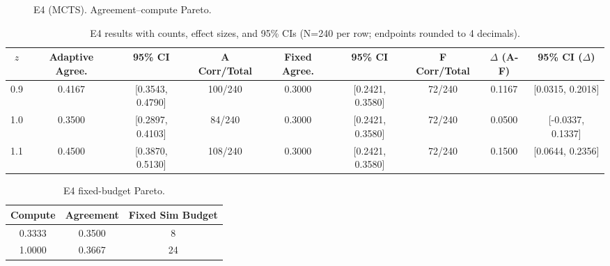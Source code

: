 \begin{figure}[H]
  \centering
  \begin{adjustbox}{width=\linewidth}
  \end{adjustbox}
  \caption{E4 (MCTS). Agreement--compute Pareto.}
  \label{fig:e4b}
\end{figure}

\begin{table}[H]
  \centering
  \caption{E4 results with counts, effect sizes, and 95\% CIs (N=240 per row; endpoints rounded to 4 decimals).}
  \vspace{0.25em}
  \begin{adjustbox}{width=\linewidth}
  \begin{tabular}{c c c c c c c c c}
    \toprule
    $z$ & Adaptive Agree. & 95\% CI & A Corr/Total & Fixed Agree. & 95\% CI & F Corr/Total & $\Delta$ (A-F) & 95\% CI ($\Delta$) \\
    \midrule
    0.9 & 0.4167 & [0.3543, 0.4790] & 100/240 & 0.3000 & [0.2421, 0.3580] & 72/240 & 0.1167 & [0.0315, 0.2018] \\
    1.0 & 0.3500 & [0.2897, 0.4103] & 84/240  & 0.3000 & [0.2421, 0.3580] & 72/240 & 0.0500 & [-0.0337, 0.1337] \\
    1.1 & 0.4500 & [0.3870, 0.5130] & 108/240 & 0.3000 & [0.2421, 0.3580] & 72/240 & 0.1500 & [0.0644, 0.2356] \\
    \bottomrule
  \end{tabular}
  \end{adjustbox}
\end{table}

\begin{table}[H]
  \centering
  \caption{E4 fixed-budget Pareto.}
  \vspace{0.25em}
  \begin{adjustbox}{width=\linewidth}
  \begin{tabular}{c c c}
    \toprule
    Compute & Agreement & Fixed Sim Budget \\
    \midrule
    0.3333 & 0.3500 & 8 \\
    1.0000 & 0.3667 & 24 \\
    \bottomrule
  \end{tabular}
  \end{adjustbox}
\end{table}

